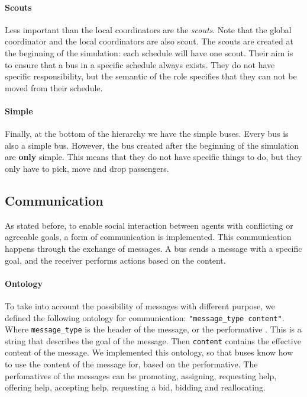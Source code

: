 \paragraph{Scouts}

Less important than the local coordinators are the \textit{scouts}. Note that the global coordinator and the local coordinators are also scout. The scouts are created at the beginning of the simulation: each schedule will have one scout. Their aim is to ensure that a bus in a specific schedule always exists. They do not have specific responsibility, but the semantic of the role specifies that they can not be moved from their schedule. 

\paragraph{Simple}

Finally, at the bottom of the hierarchy we have the simple buses. Every bus is also a simple bus. However, the bus created after the beginning of the simulation are \textbf{only} simple. This means that they do not have specific things to do, but they only have to pick, move and drop passengers. 

\subsection{Communication}

As stated before, to enable social interaction between agents with conflicting or agreeable goals, a form of communication is implemented. This communication happens through the exchange of messages. A bus sends a message with a specific goal, and the receiver performs actions based on the content.

\paragraph{Ontology}

To take into account the possibility of messages with different purpose, we defined the following ontology for communication: \texttt{"message\_type content"}. Where  \texttt{message\_type} is the header of the message, or the performative \cite{fipa}. This is a string that describes the goal of the message. Then \texttt{content} contains the effective content of the message. We implemented this ontology, so that buses know how to use the content of the message for, based on the performative. The perfomatives of the messages can be promoting, assigning, requesting help, offering help, accepting help, requesting a bid, bidding and reallocating. 


